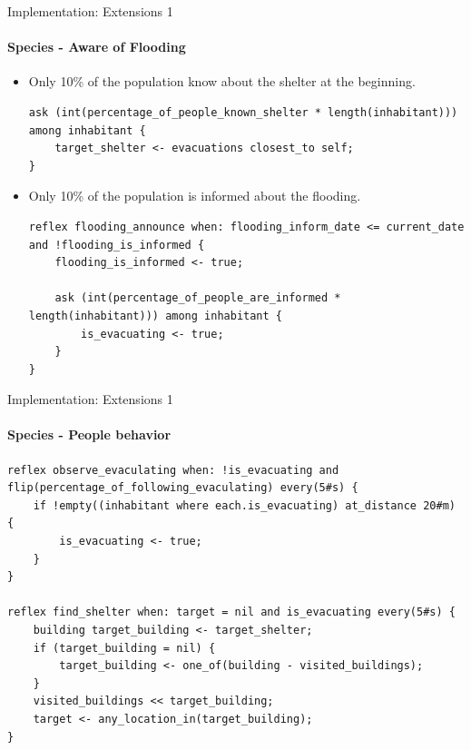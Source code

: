 \documentclass{beamer}
\begin{document}
\begin{frame}[fragile]{Implementation: Extensions 1}
\framesubtitle{Species - Aware of Flooding}

\begin{itemize}
    \item Only 10\% of the population know about the shelter at the beginning.
    
\begin{lstlisting}[style=GAML]
ask (int(percentage_of_people_known_shelter * length(inhabitant))) among inhabitant {
    target_shelter <- evacuations closest_to self;
}
\end{lstlisting}

    \item Only 10\% of the population is informed about the flooding.
\begin{lstlisting}[style=GAML]
reflex flooding_announce when: flooding_inform_date <= current_date and !flooding_is_informed {		
    flooding_is_informed <- true;
    
    ask (int(percentage_of_people_are_informed * length(inhabitant))) among inhabitant {
        is_evacuating <- true;
    }
} 
\end{lstlisting}

\end{itemize}

\end{frame}


\begin{frame}[fragile]{Implementation: Extensions 1}
\framesubtitle{Species - People behavior}

\begin{lstlisting}[style=GAML]
reflex observe_evaculating when: !is_evacuating and flip(percentage_of_following_evaculating) every(5#s) {
    if !empty((inhabitant where each.is_evacuating) at_distance 20#m)  {
        is_evacuating <- true;
    }
}

reflex find_shelter when: target = nil and is_evacuating every(5#s) {
    building target_building <- target_shelter;
    if (target_building = nil) {
        target_building <- one_of(building - visited_buildings);
    }
    visited_buildings << target_building;
    target <- any_location_in(target_building);
}
\end{lstlisting}


\end{frame}
\end{document}
